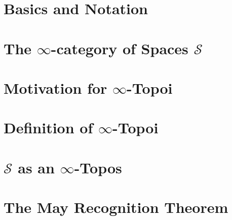 \documentclass[a4paper,10pt]{scrartcl}
\theoremstyle{plain}
\newcommand{\spaces}{\mathcal{S}}
\newcommand{\inftycat}{}
\def\inftycat/{$\infty$-category}
\begin{document}
    \section{Basics and Notation}
    
    \section{The \inftycat/ of Spaces $\spaces$}
    
    \section{Motivation for $\infty$-Topoi}
    \section{Definition of $\infty$-Topoi}
    
    \section{$\spaces$ as an $\infty$-Topos}
    
    \section{The May Recognition Theorem}
    
\end{document}
